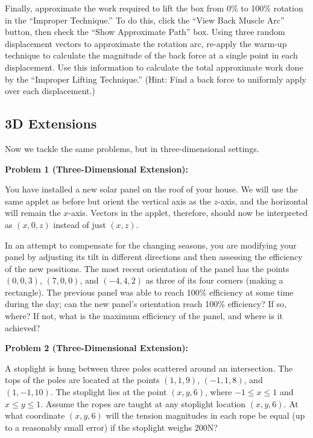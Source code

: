 \documentclass{ximera}
\begin{document}
Finally, approximate the work required to lift the box from 0\% to 100\% rotation in the ``Improper Technique.'' To do this, click the ``View Back Muscle Arc'' button, then check the ``Show Approximate Path'' box. Using three random displacement vectors to approximate the rotation arc, re-apply the warm-up technique to calculate the magnitude of the back force at a single point in each displacement. Use this information to calculate the total approximate work done by the ``Improper Lifting Technique.'' (Hint: Find a back force to uniformly apply over each displacement.)

\subsection*{3D Extensions}

Now we tackle the same problems, but in three-dimensional settings.


\textbf{Problem 1 (Three-Dimensional Extension):}

You have installed a new solar panel on the roof of your house. We will use the same applet as before but orient the vertical axis as the $z$-axis, and the horizontal will remain the $x$-axis. Vectors in the applet, therefore, should now be interpreted as $\left(x,0,z\right)$ instead of just $\left(x,z\right)$.

In an attempt to compensate for the changing seasons, you are modifying your panel by adjusting its tilt in different directions and then assessing the efficiency of the new positions. The most recent orientation of the panel has the points $\left(0,0,3\right)$, $\left(7,0,0\right)$, and $\left(-4,4,2\right)$ as three of its four corners (making a rectangle). The previous panel was able to reach 100\% efficiency at some time during the day; can the new panel's orientation reach 100\% efficiency? If so, where? If not, what is the maximum efficiency of the panel, and where is it achieved?

\textbf{Problem 2 (Three-Dimensional Extension):}

A stoplight is hung between three poles scattered around an intersection. The tops of the poles are located at the points $\left(1,1,9\right)$, $\left(-1,1,8\right)$, and $\left(1,-1,10\right)$. The stoplight lies at the point $\left(x,y,6\right)$, where $-1\leq x\leq1$ and $x\leq y\leq1$. Assume the ropes are taught at any stoplight location $\left(x,y,6\right)$. At what coordinate $\left(x,y,6\right)$ will the tension magnitudes in each rope be equal (up to a reasonably small error) if the stoplight weighs 200N?
\end{document}
